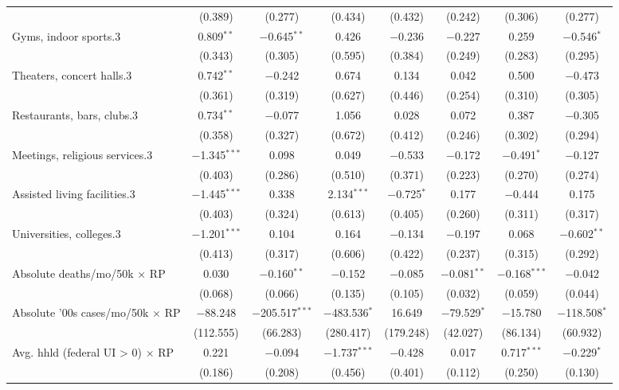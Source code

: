 \begin{table}[!htbp]
\begin{tabular}{@{\extracolsep{5pt}}lccccccc}
  & (0.389) & (0.277) & (0.434) & (0.432) & (0.242) & (0.306) & (0.277) \\ 
  Gyms, indoor sports.3 & 0.809$^{**}$ & $-$0.645$^{**}$ & 0.426 & $-$0.236 & $-$0.227 & 0.259 & $-$0.546$^{*}$ \\ 
  & (0.343) & (0.305) & (0.595) & (0.384) & (0.249) & (0.283) & (0.295) \\ 
  Theaters, concert halls.3 & 0.742$^{**}$ & $-$0.242 & 0.674 & 0.134 & 0.042 & 0.500 & $-$0.473 \\ 
  & (0.361) & (0.319) & (0.627) & (0.446) & (0.254) & (0.310) & (0.305) \\ 
  Restaurants, bars, clubs.3 & 0.734$^{**}$ & $-$0.077 & 1.056 & 0.028 & 0.072 & 0.387 & $-$0.305 \\ 
  & (0.358) & (0.327) & (0.672) & (0.412) & (0.246) & (0.302) & (0.294) \\ 
  Meetings, religious services.3 & $-$1.345$^{***}$ & 0.098 & 0.049 & $-$0.533 & $-$0.172 & $-$0.491$^{*}$ & $-$0.127 \\ 
  & (0.403) & (0.286) & (0.510) & (0.371) & (0.223) & (0.270) & (0.274) \\ 
  Assisted living facilities.3 & $-$1.445$^{***}$ & 0.338 & 2.134$^{***}$ & $-$0.725$^{*}$ & 0.177 & $-$0.444 & 0.175 \\ 
  & (0.403) & (0.324) & (0.613) & (0.405) & (0.260) & (0.311) & (0.317) \\ 
  Universities, colleges.3 & $-$1.201$^{***}$ & 0.104 & 0.164 & $-$0.134 & $-$0.197 & 0.068 & $-$0.602$^{**}$ \\ 
  & (0.413) & (0.317) & (0.606) & (0.422) & (0.237) & (0.315) & (0.292) \\ 
  Absolute deaths/mo/50k $\times$ RP & 0.030 & $-$0.160$^{**}$ & $-$0.152 & $-$0.085 & $-$0.081$^{**}$ & $-$0.168$^{***}$ & $-$0.042 \\ 
  & (0.068) & (0.066) & (0.135) & (0.105) & (0.032) & (0.059) & (0.044) \\ 
  Absolute '00s cases/mo/50k $\times$ RP & $-$88.248 & $-$205.517$^{***}$ & $-$483.536$^{*}$ & 16.649 & $-$79.529$^{*}$ & $-$15.780 & $-$118.508$^{*}$ \\ 
  & (112.555) & (66.283) & (280.417) & (179.248) & (42.027) & (86.134) & (60.932) \\ 
  Avg. hhld  (federal UI > 0) $\times$ RP & 0.221 & $-$0.094 & $-$1.737$^{***}$ & $-$0.428 & 0.017 & 0.717$^{***}$ & $-$0.229$^{*}$ \\ 
  & (0.186) & (0.208) & (0.456) & (0.401) & (0.112) & (0.250) & (0.130) \\ 

\end{tabular}
\end{table}
